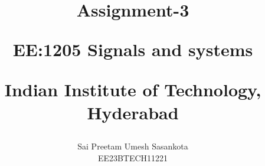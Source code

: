 \documentclass[journal,12pt,twocolumn]{IEEEtran}
\theoremstyle{remark}
\begin{document}
%




\vspace{3cm}

\title{
Assignment-3

\large{EE:1205 Signals and systems}

Indian Institute of Technology, Hyderabad
}
\author{Sai Preetam Umesh Sasankota

EE23BTECH11221
}	


%
%
%

% 
%



% 
\end{document}
